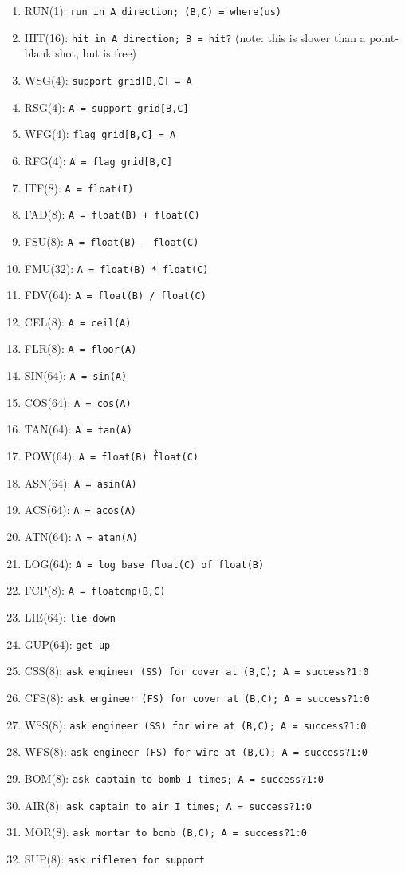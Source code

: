 \documentclass{article}
\begin{document}
\begin{enumerate}[noitemsep]
    \item RUN(1): \texttt{run in A direction; (B,C) = where(us)}
    \item HIT(16): \texttt{hit in A direction; B = hit?} (note: this is slower
        than a point-blank shot, but is free)
    \item WSG(4): \texttt{support grid[B,C] = A}
    \item RSG(4): \texttt{A = support grid[B,C]}
    \item WFG(4): \texttt{flag grid[B,C] = A}
    \item RFG(4): \texttt{A = flag grid[B,C]}
    \item ITF(8): \texttt{A = float(I)}
    \item FAD(8): \texttt{A = float(B) + float(C)}
    \item FSU(8): \texttt{A = float(B) - float(C)}
    \item FMU(32): \texttt{A = float(B) * float(C)}
    \item FDV(64): \texttt{A = float(B) / float(C)}
    \item CEL(8): \texttt{A = ceil(A)}
    \item FLR(8): \texttt{A = floor(A)}
    \item SIN(64): \texttt{A = sin(A)}
    \item COS(64): \texttt{A = cos(A)}
    \item TAN(64): \texttt{A = tan(A)}
    \item POW(64): \texttt{A = float(B) \^ float(C)}
    \item ASN(64): \texttt{A = asin(A)}
    \item ACS(64): \texttt{A = acos(A)}
    \item ATN(64): \texttt{A = atan(A)}
    \item LOG(64): \texttt{A = log base float(C) of float(B)}
    \item FCP(8): \texttt{A = floatcmp(B,C)}
    \item LIE(64): \texttt{lie down}
    \item GUP(64): \texttt{get up}
    \item CSS(8): \texttt{ask engineer (SS) for cover at (B,C); A = success?1:0}
    \item CFS(8): \texttt{ask engineer (FS) for cover at (B,C); A = success?1:0}
    \item WSS(8): \texttt{ask engineer (SS) for wire at (B,C); A = success?1:0}
    \item WFS(8): \texttt{ask engineer (FS) for wire at (B,C); A = success?1:0}
    \item BOM(8): \texttt{ask captain to bomb I times; A = success?1:0}
    \item AIR(8): \texttt{ask captain to air I times; A = success?1:0}
    \item MOR(8): \texttt{ask mortar to bomb (B,C); A = success?1:0}
    \item SUP(8): \texttt{ask riflemen for support}
\end{enumerate}
\end{document}
